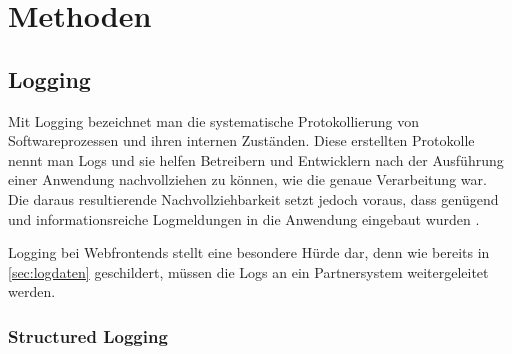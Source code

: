 

\vspace{-\baselineskip}

\section{Methoden}

\subsection{Logging}


Mit Logging bezeichnet man die systematische Protokollierung von Softwareprozessen und ihren internen Zuständen. Diese erstellten Protokolle nennt man Logs und sie helfen Betreibern und Entwicklern nach der Ausführung einer Anwendung nachvollziehen zu können, wie die genaue Verarbeitung war. Die daraus resultierende Nachvollziehbarkeit setzt jedoch voraus, dass genügend und informationsreiche Logmeldungen in die Anwendung eingebaut wurden \cite{LearningToLog}.

Logging bei Webfrontends stellt eine besondere Hürde dar, denn wie bereits in \autoref{sec:logdaten} geschildert, müssen die Logs an ein Partnersystem weitergeleitet werden.

\subsubsection{Structured Logging}

